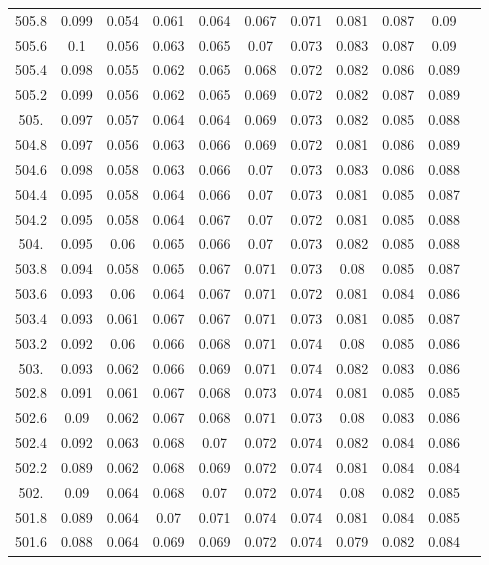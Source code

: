 \documentclass[12pt]{ctexart}
\numberwithin{equation}{section}
\begin{document}
\begin{longtable}{ccccccccccc}
505.8	&	0.099	&	0.054	&	0.061	&	0.064	&	0.067	&	0.071	&	0.081	&	0.087	&	0.09	\\
505.6	&	0.1	&	0.056	&	0.063	&	0.065	&	0.07	&	0.073	&	0.083	&	0.087	&	0.09	\\
505.4	&	0.098	&	0.055	&	0.062	&	0.065	&	0.068	&	0.072	&	0.082	&	0.086	&	0.089	\\
505.2	&	0.099	&	0.056	&	0.062	&	0.065	&	0.069	&	0.072	&	0.082	&	0.087	&	0.089	\\
505.	&	0.097	&	0.057	&	0.064	&	0.064	&	0.069	&	0.073	&	0.082	&	0.085	&	0.088	\\
504.8	&	0.097	&	0.056	&	0.063	&	0.066	&	0.069	&	0.072	&	0.081	&	0.086	&	0.089	\\
504.6	&	0.098	&	0.058	&	0.063	&	0.066	&	0.07	&	0.073	&	0.083	&	0.086	&	0.088	\\
504.4	&	0.095	&	0.058	&	0.064	&	0.066	&	0.07	&	0.073	&	0.081	&	0.085	&	0.087	\\
504.2	&	0.095	&	0.058	&	0.064	&	0.067	&	0.07	&	0.072	&	0.081	&	0.085	&	0.088	\\
504.	&	0.095	&	0.06	&	0.065	&	0.066	&	0.07	&	0.073	&	0.082	&	0.085	&	0.088	\\
503.8	&	0.094	&	0.058	&	0.065	&	0.067	&	0.071	&	0.073	&	0.08	&	0.085	&	0.087	\\
503.6	&	0.093	&	0.06	&	0.064	&	0.067	&	0.071	&	0.072	&	0.081	&	0.084	&	0.086	\\
503.4	&	0.093	&	0.061	&	0.067	&	0.067	&	0.071	&	0.073	&	0.081	&	0.085	&	0.087	\\
503.2	&	0.092	&	0.06	&	0.066	&	0.068	&	0.071	&	0.074	&	0.08	&	0.085	&	0.086	\\
503.	&	0.093	&	0.062	&	0.066	&	0.069	&	0.071	&	0.074	&	0.082	&	0.083	&	0.086	\\
502.8	&	0.091	&	0.061	&	0.067	&	0.068	&	0.073	&	0.074	&	0.081	&	0.085	&	0.085	\\
502.6	&	0.09	&	0.062	&	0.067	&	0.068	&	0.071	&	0.073	&	0.08	&	0.083	&	0.086	\\
502.4	&	0.092	&	0.063	&	0.068	&	0.07	&	0.072	&	0.074	&	0.082	&	0.084	&	0.086	\\
502.2	&	0.089	&	0.062	&	0.068	&	0.069	&	0.072	&	0.074	&	0.081	&	0.084	&	0.084	\\
502.	&	0.09	&	0.064	&	0.068	&	0.07	&	0.072	&	0.074	&	0.08	&	0.082	&	0.085	\\
501.8	&	0.089	&	0.064	&	0.07	&	0.071	&	0.074	&	0.074	&	0.081	&	0.084	&	0.085	\\
501.6	&	0.088	&	0.064	&	0.069	&	0.069	&	0.072	&	0.074	&	0.079	&	0.082	&	0.084	\\

\end{longtable}
\end{document}
